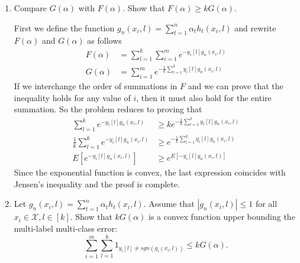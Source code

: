 \documentclass{article}
\newcommand{\cX}{{\mathcal X}}
\begin{document}
\begin{enumerate}
\item Compare $G(\alpha)$ with $F(\alpha)$.
Show that $F(\alpha)\geq k G(\alpha)$. 

First we define the function $g_n(x_i,l)=\sum_{t=1}^n \alpha_t h_t(x_i,l)$ and rewrite $F(\alpha)$ and $G(\alpha)$ as follows
\begin{align*}
    F(\alpha) &= \sum_{l=1}^k \sum_{i=1}^m e^{-y_i[l]g_n(x_i,l)} \\
    G(\alpha) &= \sum_{i=1}^m e^{-\frac{1}{k} \sum_{l=1}^k y_i[l]g_n(x_i,l)}
\end{align*}
If we interchange the order of summations in $F$ and we can prove that the inequality holds for any value of $i$, then it must also hold for the entire summation. So the problem reduces to proving that
\begin{align*}
    \sum_{l=1}^k e^{-y_i[l]g_n(x_i,l)} &\geq k e^{-\frac{1}{k} \sum_{l=1}^k y_i[l]g_n(x_i,l)} \\
    \frac{1}{k} \sum_{l=1}^k e^{-y_i[l]g_n(x_i,l)} &\geq e^{-\frac{1}{k} \sum_{l=1}^k y_i[l]g_n(x_i,l)} \\
    E\left[e^{-y_i[l]g_n(x_i,l)}\right] &\geq e^{E[-y_i[l]g_n(x_i,l)]}
\end{align*}
Since the exponential function is convex, the last expression coincides with Jensen's inequality and the proof is complete.

\item Let $g_n(x_i,l) = \sum_{t=1}^n\alpha_th_t(x_i,l)$. Assume that $|g_n(x_i,l)| \leq 1$ for all $x_i \in \cX, l \in [k]$. Show that $kG(\alpha)$ is a convex function upper bounding the multi-label multi-class error:
$$\sum_{i=1}^m \sum_{l=1}^k 1_{y_i[l]\ne sgn\left( g_i(x_i,l)\right)}\leq kG(\alpha).$$


\end{enumerate}
\end{document}
